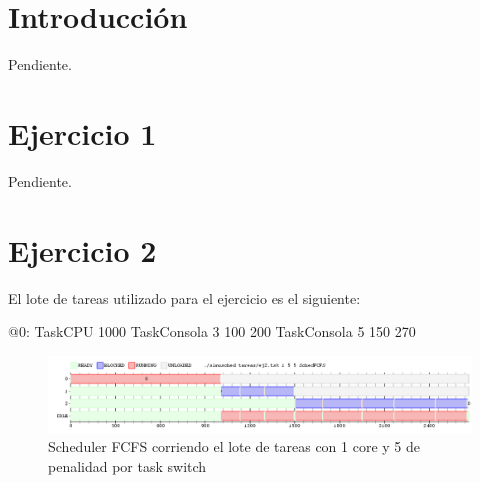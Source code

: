 \documentclass[a4paper,10pt,twoside]{article}
\newenvironment{pseudo}[1][]{%
    \vspace{0.5em}%
    \begin{algorithmic}%
}
{%
    \end{algorithmic}%
    \vspace{0.5em}%
}
\begin{document}
\newpage




\tableofcontents

\newpage




\section{Introducción}

Pendiente.




\section{Ejercicio 1}

Pendiente.




\section{Ejercicio 2}
El lote de tareas utilizado para el ejercicio es el siguiente:
\begin{pseudo}
	\State @0:
	\State TaskCPU 1000
	\State TaskConsola 3 100 200
	\State TaskConsola 5 150 270
\end{pseudo}

\begin{figure}[ht!]
\centering
\includegraphics[width=180mm]{../ejercicio2/FCFS1Core.png}
\caption{Scheduler FCFS corriendo el lote de tareas con 1 core y 5 de penalidad por task switch}
\label{overflow}
\end{figure}
\end{document}
